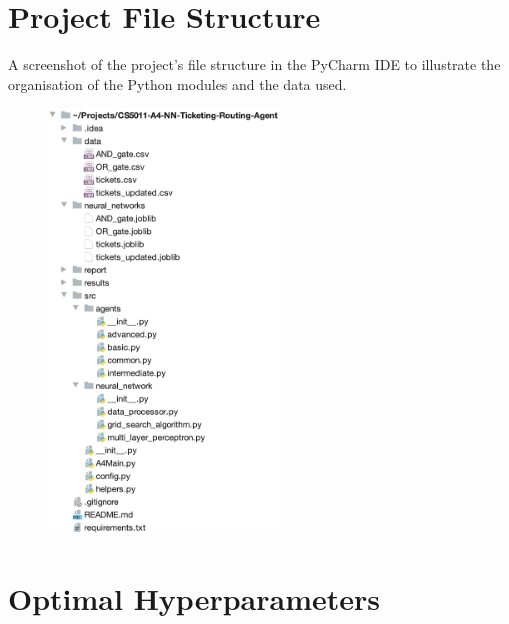 \documentclass[letterpaper,12pt]{article}
\begin{document}
\begin{appendices}

\clearpage




\clearpage
\section{Project File Structure}
\label{sec:appendix-project-file-structure}

A screenshot of the project’s file structure in the PyCharm IDE to illustrate the organisation of the Python modules and the data used.

\begin{figure}[h] 
\centerline{\includegraphics[width=0.55\textwidth]{report/figures/project_structure.png}}
\label{fig:project_structure}
\end{figure}


\clearpage
\section{Optimal Hyperparameters}
\label{sec:appendix-optimal-hyperparameters}


\end{appendices}
\end{document}
